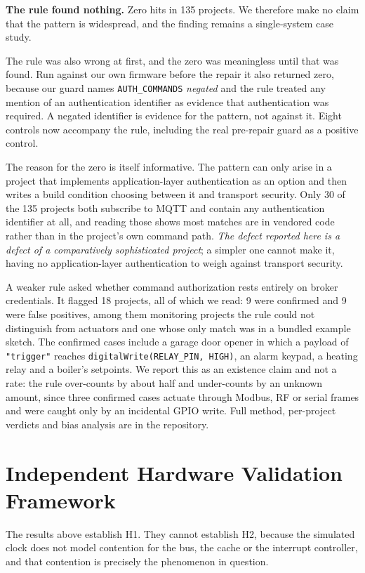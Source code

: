 \textbf{The rule found nothing.} Zero hits in 135 projects. We therefore make no claim that the
pattern is widespread, and the finding remains a single-system case study.

The rule was also wrong at first, and the zero was meaningless until that was found. Run
against our own firmware before the repair it also returned zero, because our guard names
\texttt{AUTH\_COMMANDS} \emph{negated} and the rule treated any mention of an authentication
identifier as evidence that authentication was required. A negated identifier is evidence for
the pattern, not against it. Eight controls now accompany the rule, including the real
pre-repair guard as a positive control.

The reason for the zero is itself informative. The pattern can only arise in a project that
implements application-layer authentication as an option and then writes a build condition
choosing between it and transport security. Only 30 of the 135 projects both subscribe to MQTT
and contain any authentication identifier at all, and reading those shows most matches are in
vendored code rather than in the project's own command path. \emph{The defect reported here is
a defect of a comparatively sophisticated project}; a simpler one cannot make it, having no
application-layer authentication to weigh against transport security.

A weaker rule asked whether command authorization rests entirely on broker credentials. It
flagged 18 projects, all of which we read: 9 were confirmed and 9 were false positives, among
them monitoring projects the rule could not distinguish from actuators and one whose only match
was in a bundled example sketch. The confirmed cases include a garage door opener in which a
payload of \texttt{"trigger"} reaches \texttt{digitalWrite(RELAY\_PIN, HIGH)}, an alarm keypad,
a heating relay and a boiler's setpoints. We report this as an existence claim and not a rate:
the rule over-counts by about half and under-counts by an unknown amount, since three confirmed
cases actuate through Modbus, RF or serial frames and were caught only by an incidental GPIO
write. Full method, per-project verdicts and bias analysis are in the repository.


\section{Independent Hardware Validation Framework}\label{sec:hw}

The results above establish H1. They cannot establish H2, because the simulated clock does not
model contention for the bus, the cache or the interrupt controller, and that contention is
precisely the phenomenon in question.

